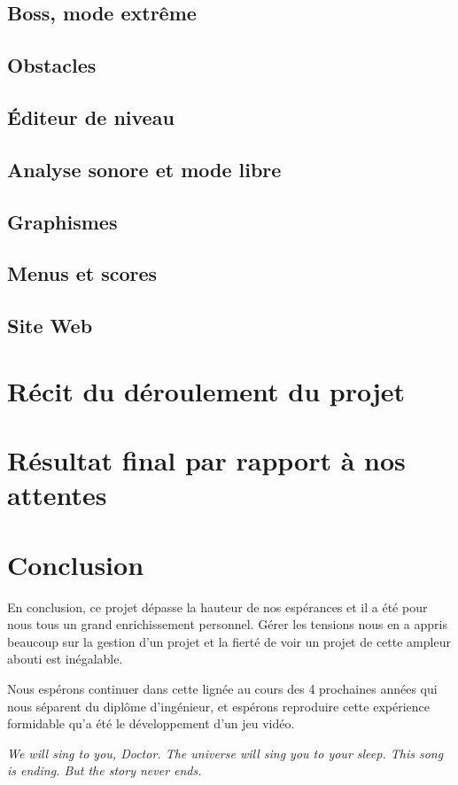 \documentclass[12pt,a4paper]{article}
\begin{document}
		\subsection{Boss, mode extrême}
			
		\subsection{Obstacles}
			
		\subsection{Éditeur de niveau}
			
		\subsection{Analyse sonore et mode libre}
			
		\subsection{Graphismes}
			
		\subsection{Menus et scores}
			
		\subsection{Site Web}
			
	
	\section{Récit du déroulement du projet}
			
			
	\section{Résultat final par rapport à nos attentes}
		
	
	\section{Conclusion}
		\par En conclusion, ce projet dépasse la hauteur de nos espérances et il a été pour nous tous un grand enrichissement personnel. Gérer les tensions nous en a appris beaucoup sur la gestion d'un projet et la fierté de voir un projet de cette ampleur abouti est inégalable.
		\par Nous espérons continuer dans cette lignée au cours des 4 prochaines années qui nous séparent du diplôme d'ingénieur, et espérons reproduire cette expérience formidable qu'a été le développement d'un jeu vidéo.
		\vspace{2cm}		
		\par \emph{We will sing to you, Doctor. The universe will sing you to your sleep. This song is ending. But the story never ends.}
\end{document}
